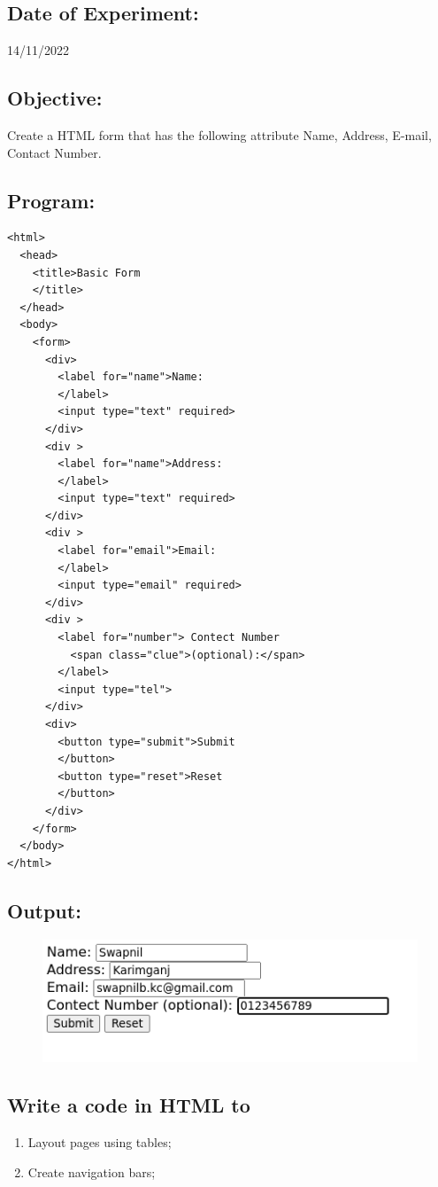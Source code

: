 \documentclass[12pt, a4paper]{article}
\begin{document}
\subsection*{Date of Experiment:}
14/11/2022
\subsection*{Objective:}
Create a HTML form that has the following attribute Name, Address, E-mail, Contact Number.

\subsection*{Program:}
\begin{lstlisting}
<html>
  <head>
    <title>Basic Form
    </title>
  </head>
  <body>
    <form>
      <div>
        <label for="name">Name:
        </label>
        <input type="text" required>
      </div>
      <div >
        <label for="name">Address:
        </label>
        <input type="text" required>
      </div>
      <div >
        <label for="email">Email:
        </label>
        <input type="email" required>
      </div>
      <div >
        <label for="number"> Contect Number 
          <span class="clue">(optional):</span>
        </label>
        <input type="tel">
      </div>
      <div>
        <button type="submit">Submit
        </button>
        <button type="reset">Reset
        </button>
      </div>
    </form>
  </body>
</html>
\end{lstlisting}
\subsection*{Output:}
\vskip10pt
\begin{figure}[h]
  \centering
  \includegraphics{10}
\end{figure}

\pagebreak

\begin{tcolorbox}
  \section{Write a code in HTML to}
  \begin{enumerate}
    \item Layout pages using tables;
    \item Create navigation bars;
  \end{enumerate}
\end{tcolorbox}
\end{document}

